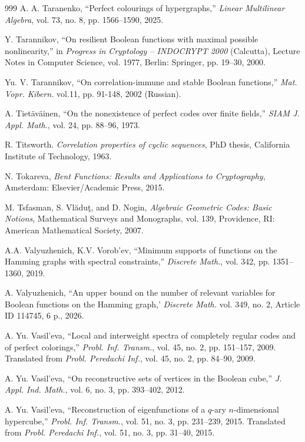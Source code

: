 \documentclass[11pt]{article}
\theoremstyle{definition}
\begin{document}
{{{\begin{thebibliography}{999}
A. A. Taranenko,
``Perfect colourings of hypergraphs,''
\textit{Linear Multilinear Algebra}, vol. 73, no. 8, pp. 1566--1590, 2025.

Y. Tarannikov,
``On resilient Boolean functions with maximal possible nonlinearity,''
in \textit{Progress in Cryptology -- INDOCRYPT 2000} (Calcutta),
Lecture Notes in Computer Science, vol. 1977,
Berlin: Springer, pp. 19--30, 2000.

 Yu. V. Tarannikov,
``On correlation-immune and stable Boolean functions,''
\textit{Mat. Vopr. Kibern. } vol.11,  pp. 91-148, 2002  (Russian). 

A. Tietäväinen,
``On the nonexistence of perfect codes over finite fields,''
\textit{SIAM J. Appl. Math.}, vol. 24, pp. 88--96, 1973.

R. Titsworth. \textit{Correlation properties of cyclic sequences}, PhD thesis, California Institute of Technology,
1963.


N. Tokareva,
\textit{Bent Functions: Results and Applications to Cryptography},
Amsterdam: Elsevier/Academic Press, 2015.

M. Tsfasman, S. Vlăduţ, and D. Nogin,
\textit{Algebraic Geometric Codes: Basic Notions},
Mathematical Surveys and Monographs, vol. 139,
Providence, RI: American Mathematical Society, 2007.

A.A. Valyuzhenich, K.V. Vorob’ev, ``Minimum supports of functions on the Hamming graphs with
spectral constraints,'' \textit{Discrete Math.}, vol. 342, pp. 1351--1360, 2019. 



A. Valyuzhenich,
``An upper bound on the number of relevant variables for Boolean functions on the Hamming graph,' 
\textit{Discrete Math. } vol. 349, no. 2, Article ID 114745, 6 p.,  2026.

A. Yu. Vasil'eva,
``Local and interweight spectra of completely regular codes and of perfect colorings,''
\textit{Probl. Inf. Transm.}, vol. 45, no. 2, pp. 151--157, 2009.
Translated from \textit{Probl. Peredachi Inf.}, vol. 45, no. 2, pp. 84--90, 2009.

A. Yu. Vasil'eva,
``On reconstructive sets of vertices in the Boolean cube,''
\textit{J. Appl. Ind. Math.}, vol. 6, no. 3, pp. 393--402, 2012.

A. Yu. Vasil'eva,
``Reconstruction of eigenfunctions of a $q$-ary $n$-dimensional hypercube,''
\textit{Probl. Inf. Transm.}, vol. 51, no. 3, pp. 231--239, 2015.
Translated from \textit{Probl. Peredachi Inf.}, vol. 51, no. 3, pp. 31--40, 2015.


\end{thebibliography}}}}
\end{document}
